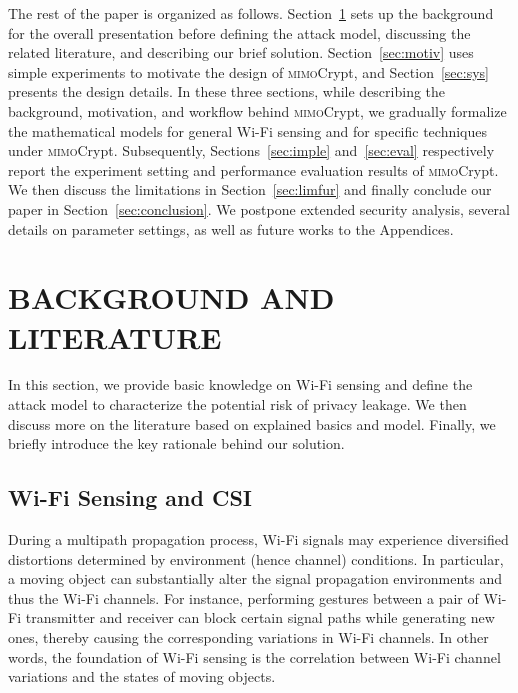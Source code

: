\documentclass[conference,compsoc]{IEEEtran}
\newcommand{\sname}{\textsc{mimo}Crypt\xspace}
\newcommand{\newrev}[1]{{\color{blue}#1}}    %
\newcommand{\newrev}[1]{#1}
\begin{document}
%
The rest of the paper is organized as follows. Section~\ref{sec:background} sets up the background for the overall presentation before defining the attack model, discussing the related literature, and describing our brief solution. Section~\ref{sec:motiv} uses simple experiments to motivate the design of \sname, and Section~\ref{sec:sys} presents the design details. In these three sections, while describing the background, motivation, and workflow behind \sname, we gradually formalize the mathematical models for general Wi-Fi sensing and for specific techniques under \sname. Subsequently, Sections~\ref{sec:imple} and~\ref{sec:eval} respectively report the experiment setting and performance evaluation results of \sname. 
We then discuss the limitations in Section~\ref{sec:limfur} and finally conclude our paper in Section~\ref{sec:conclusion}. 
We postpone \newrev{extended security analysis,}
several details on parameter settings, as well as future works to the Appendices.


\section{\MakeUppercase{Background and Literature}}
\label{sec:background}
\vspace{-1ex}
%
In this section, we provide basic knowledge on Wi-Fi sensing and define the attack model to characterize the potential risk of privacy leakage. We then discuss more on the literature based on explained basics and model. \newrev{Finally, we briefly introduce the key rationale behind our solution.}

\vspace{-1ex}
\subsection{Wi-Fi Sensing and CSI} \label{ssec:basic}
\vspace{-1ex}
%
During a multipath propagation process, Wi-Fi signals may experience diversified distortions determined by environment (hence channel) conditions. In particular, 
a moving object can substantially alter the signal propagation environments and thus the Wi-Fi channels. For instance, performing gestures between a pair of Wi-Fi transmitter and receiver can block certain signal paths while generating new ones, thereby causing the corresponding variations in Wi-Fi channels. In other words, the foundation of Wi-Fi sensing is the correlation between Wi-Fi channel variations and the states of moving objects.
\end{document}
